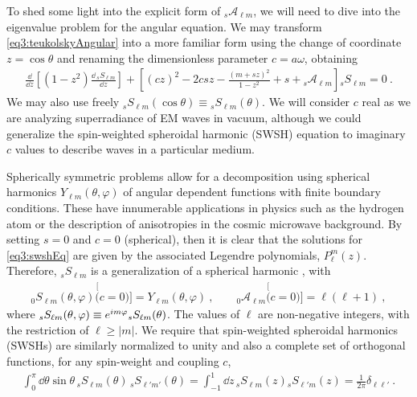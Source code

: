 To shed some light into the explicit form of ${}_{s}\mathscr{A}_{\ell m}$, we will need to dive into the eigenvalue problem for the angular equation. We may transform \eqref{eq3:teukolskyAngular} into a more familiar form using the change of coordinate $z=\cos\theta$ and renaming the dimensionless parameter $c=a \omega$, obtaining
\begin{align}
    \frac{\dd}{\dd z} \left[ (1-z^2) \frac{\dd\, {}_{s}S_{\ell m}}{\dd z} \right] + \left[ (c z)^2 - 2 c s z  -\frac{(m + s z)^2}{1 - z^2} + s  + {}_{s}\mathscr{A}_{\ell m} \right] {}_{s}S_{\ell m} = 0 ~.
    \label{eq3:swshEq}
\end{align}
We may also use freely ${}_{s}S_{\ell m}(\cos\theta) \equiv {}_{s}S_{\ell m}(\theta)$.
We will consider $c$ real as we are analyzing superradiance of EM waves in vacuum, although we could generalize the spin-weighted spheroidal harmonic (SWSH) equation to imaginary $c$ values to describe waves in a particular medium.

Spherically symmetric problems allow for a decomposition using spherical harmonics $Y_{\ell m}(\theta,\varphi)$ of angular dependent functions with finite boundary conditions.
These have innumerable applications in physics such as the hydrogen atom or the description of anisotropies in the cosmic microwave background.
By setting $s=0$ and $c=0$ (spherical), then it is clear that the solutions for \eqref{eq3:swshEq} are given by the associated Legendre polynomials, $P^m_\ell(z)$. Therefore, ${}_{s}S_{\ell m}$ is a generalization of a spherical harmonic \cite{Berti2005}, with
\begin{align}
    {}_{0}S_{\ell m}(\theta,\varphi) \stackrel[(c=0)]{}{=} Y_{\ell m}(\theta,\varphi) ~,\qquad {}_{0}\mathscr{A}_{\ell m} \stackrel[(c=0)]{}{=} \ell (\ell + 1) ~,
\end{align}
where $\uu[s]{S}{\ell m}(\theta,\varphi) \equiv e^{i m \varphi} \uu[s]{S}{\ell m}(\theta)$.
The values of $\ell$ are non-negative integers, with the restriction of $\ell \ge |m|$. 
We require that spin-weighted spheroidal harmonics (SWSHs) are similarly normalized to unity and also a complete set of orthogonal functions, for any spin-weight and coupling $c$,
\begin{align}
    \label{eq3:SWSHorthogonality}
    \int_{0}^\pi \dd\theta \sin\theta \,{}_{s}S_{\ell m}(\theta) \,{}_{s}S_{\ell' m'}(\theta)  =
    \int_{-1}^{1} \dd z \,{}_{s}S_{\ell m}(z) {}_{s}S_{\ell' m}(z) = \frac{1}{2\pi} \delta_{\ell \ell'} ~.
\end{align}

